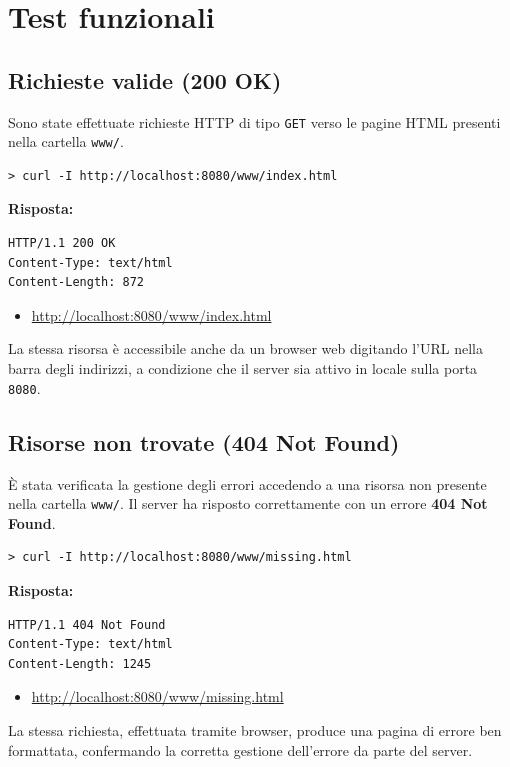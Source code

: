 \documentclass[a4paper,12pt]{report}
\begin{document}
\section{Test funzionali}
\subsection{Richieste valide (200 OK)}
Sono state effettuate richieste HTTP di tipo \texttt{GET} verso le pagine HTML presenti nella cartella \texttt{www/}.

\begin{verbatim}
> curl -I http://localhost:8080/www/index.html
\end{verbatim}

\textbf{Risposta:}
\begin{verbatim}
HTTP/1.1 200 OK
Content-Type: text/html
Content-Length: 872
\end{verbatim}

\begin{itemize}
    \item \url{http://localhost:8080/www/index.html}
\end{itemize}
La stessa risorsa è accessibile anche da un browser web digitando l'URL nella barra degli indirizzi, a condizione che il server sia attivo in locale sulla porta \texttt{8080}.

\newpage
\subsection{Risorse non trovate (404 Not Found)}
È stata verificata la gestione degli errori accedendo a una risorsa non presente nella cartella \texttt{www/}. Il server ha risposto correttamente con un errore \textbf{404 Not Found}.
\begin{verbatim}
> curl -I http://localhost:8080/www/missing.html
\end{verbatim}

\textbf{Risposta:}
\begin{verbatim}
HTTP/1.1 404 Not Found
Content-Type: text/html
Content-Length: 1245
\end{verbatim}

\begin{itemize}
    \item \url{http://localhost:8080/www/missing.html}
\end{itemize}
La stessa richiesta, effettuata tramite browser, produce una pagina di errore ben formattata, confermando la corretta gestione dell'errore da parte del server.
\end{document}
